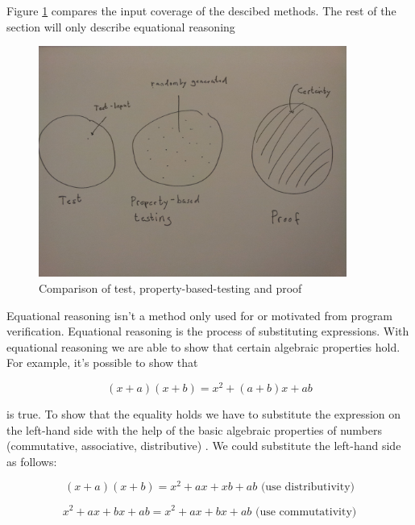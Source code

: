 Figure \ref{fig:property_validation} compares the input coverage of the descibed methods. The rest of the section will only describe equational reasoning

\begin{figure}
  \centering
     \includegraphics[width=0.9\textwidth]{comp}
  \caption{Comparison of test, property-based-testing and proof}
  \label{fig:property_validation}
\end{figure}

Equational reasoning isn't a method only used for or motivated from program verification. Equational reasoning is the process of substituting expressions. With equational reasoning we are able to show that certain algebraic properties hold.
For example, it's possible to show that

\begin{equation}
  \label{eq:sum}
  (x+a)(x+b) = x^2 + (a+b)x+ab
\end{equation}

is true. To show that the equality holds we have to substitute the expression on the left-hand side with the help of the basic algebraic properties of numbers (commutative, associative, distributive) \cite{hutton}. We could substitute the left-hand side as follows:

\begin{equation}
  \label{eq:algebra}
  (x+a)(x+b) = x^2 + ax + xb + ab \text{     (use distributivity)}
\end{equation}

\begin{equation}
x^2 + ax + bx + ab = x^2 + ax + bx + ab \text{     (use commutativity)}
\end{equation}

